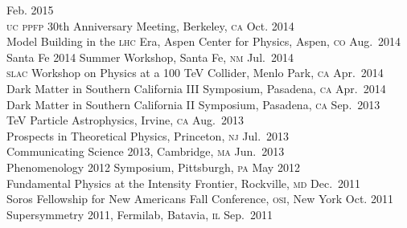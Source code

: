 \documentclass[margin,line]{resume}
\newcommand{\scap}[1]{\textsc{\MakeLowercase{#1}}}
\begin{document}
\begin{resume}
\hfill 
Feb. 2015\vspace{.7mm}\\   
%
\scap{UC PPFP} 30th Anniversary Meeting, Berkeley, \scap{CA}
\hfill 
Oct. 2014\vspace{.7mm}\\   
%
Model Building in the \scap{LHC} Era, Aspen Center for Physics, Aspen, \scap{CO}
\hfill Aug.~2014\vspace{.7mm}\\   
%
Santa Fe 2014 Summer Workshop, Santa Fe, \scap{NM}
\hfill Jul.~2014\vspace{.7mm}\\   
% 
\scap{SLAC} Workshop on Physics at a 100 TeV Collider, Menlo Park, \scap{CA}
\hfill Apr.~2014\vspace{.7mm}\\   
%
Dark Matter in Southern California III Symposium, Pasadena, \scap{CA}
\hfill Apr.~2014\vspace{.7mm}\\   
%   
Dark Matter in Southern California II Symposium, Pasadena, \scap{CA}
\hfill Sep.~2013\vspace{.7mm}\\
%
TeV Particle Astrophysics, Irvine, \scap{CA }
\hfill Aug.~2013\vspace{.7mm}\\
%
Prospects in Theoretical Physics, Princeton, \scap{NJ}
\hfill Jul.~2013\vspace{.7mm}\\
%
Communicating Science 2013, Cambridge, \scap{MA}
\hfill Jun.~2013\vspace{.7mm}\\
%
Phenomenology 2012 Symposium, Pittsburgh, \scap{PA}
\hfill May 2012\vspace{.7mm}\\
%
Fundamental Physics at the Intensity Frontier, Rockville, \scap{MD}
\hfill Dec.~2011\vspace{.7mm}\\
%
Soros Fellowship for New Americans Fall Conference, \scap{OSI}, New York 
\hfill 
Oct. 2011\vspace{.7mm}\\
%
Supersymmetry 2011, Fermilab, Batavia, \scap{IL}
\hfill 
Sep.~2011\vspace{.7mm}\\

\end{resume}
\end{document}
